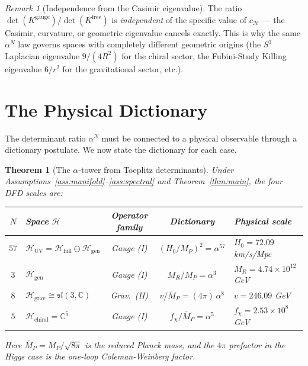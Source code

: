 \documentclass[11pt]{article}
\newtheorem{theorem}{Theorem}[section]
\theoremstyle{definition}
\theoremstyle{remark}
\newtheorem*{remark}{Remark}
\newcommand{\Mp}{M_P}
\newcommand{\Mpr}{\bar{M}_P}
\begin{document}
\begin{remark}[Independence from the Casimir eigenvalue]
The ratio $\det(K^{\mathrm{gauge}}) / \det(K^{\mathrm{free}})$ is
\textit{independent} of the specific value of $c_{\mathcal{H}}$ ---
the Casimir, curvature, or geometric eigenvalue cancels exactly. This
is why the same $\alpha^N$ law governs spaces with completely different
geometric origins (the $S^3$ Laplacian eigenvalue $9/(4R^2)$ for the
chiral sector, the Fubini-Study Killing eigenvalue $6/r^2$ for the
gravitational sector, etc.).
\end{remark}


\section{The Physical Dictionary}
\label{sec:dictionary}

The determinant ratio $\alpha^N$ must be connected to a physical
observable through a dictionary postulate. We now state the dictionary
for each case.

\begin{theorem}[The $\alpha$-tower from Toeplitz determinants]
\label{thm:tower}
Under Assumptions~\ref{ass:manifold}--\ref{ass:spectral} and
Theorem~\ref{thm:main}, the four DFD scales are:

\begin{center}
\renewcommand{\arraystretch}{1.5}
\begin{tabular}{clccl}
\toprule
$N$ & \textbf{Space $\mathcal{H}$} & \textbf{Operator family}
& \textbf{Dictionary} & \textbf{Physical scale} \\
\midrule
$57$ & $\mathcal{H}_{\mathrm{UV}} = \mathcal{H}_{\mathrm{full}}
\ominus \mathcal{H}_{\mathrm{gen}}$ & Gauge (I)
& $(H_0/\Mp)^2 = \alpha^{57}$ & $H_0 = 72.09$ km/s/Mpc \\
$3$ & $\mathcal{H}_{\mathrm{gen}}$ & Gauge (I)
& $M_R / \Mp = \alpha^3$ & $M_R = 4.74 \times 10^{12}$ GeV \\
$8$ & $\mathcal{H}_{\mathrm{grav}} \cong \mathfrak{sl}(3,\mathbb{C})$
& Grav.\ (II)
& $v / \Mpr = (4\pi)\, \alpha^8$ & $v = 246.09$ GeV \\
$5$ & $\mathcal{H}_{\mathrm{chiral}} = \mathbb{C}^5$ & Gauge (I)
& $f_\chi / \Mpr = \alpha^5$ & $f_\chi = 2.53 \times 10^8$ GeV \\
\bottomrule
\end{tabular}
\end{center}

Here $\Mpr = \Mp / \sqrt{8\pi}$ is the reduced Planck mass, and the
$4\pi$ prefactor in the Higgs case is the one-loop Coleman-Weinberg
factor.
\end{theorem}
\end{document}
